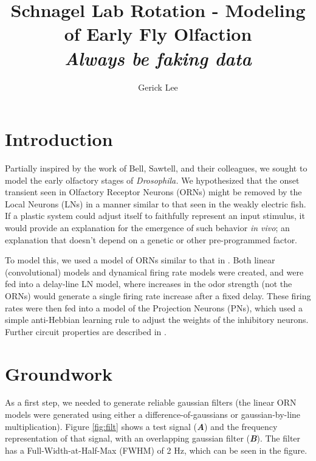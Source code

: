 \documentclass[a4paper,12pt,twoside]{article}
\begin{document}
\title{Schnagel Lab Rotation - Modeling of Early Fly Olfaction\\
  \large \textit{Always be faking data}}
\author{Gerick Lee}
\date{}
\maketitle
\section{Introduction}

Partially inspired by the work of Bell, Sawtell, and their colleagues\cite{Bell1993, Bell2000,  Bell1981, Kennedy2014}, we sought to model the early olfactory stages of  \textit{Drosophila.}  We hypothesized that the onset transient seen in Olfactory Receptor Neurons (ORNs) might be removed by the Local Neurons (LNs) in a manner similar to that seen in the weakly electric fish.  If a plastic system could adjust itself to faithfully represent an input stimulus, it would provide an explanation for the emergence of such behavior \textit{in vivo}; an explanation that doesn't depend on a genetic or other pre-programmed factor.

To model this, we used a model of ORNs similar to that in \citet{Nagel2011}.  Both linear (convolutional) models and dynamical firing rate models were created, and were fed into a delay-line LN model, where increases in the odor strength (not the ORNs) would generate a single firing rate increase after a fixed delay.  These firing rates were then fed into a model of the Projection Neurons (PNs), which used a simple anti-Hebbian learning rule to adjust the weights of the inhibitory neurons.  Further circuit properties are described in \citet{Wilson2013}.

\section{Groundwork}
As a first step, we needed to generate reliable gaussian filters (the linear ORN models were generated using either a difference-of-gaussians or gaussian-by-line multiplication).  Figure \ref{fig:filt} shows a test signal (\textit{\textbf{A}}) and the frequency representation of that signal, with an overlapping gaussian filter (\textit{\textbf{B}}).  The filter has a Full-Width-at-Half-Max (FWHM) of 2 Hz, which can be seen in the figure.  
\end{document}
